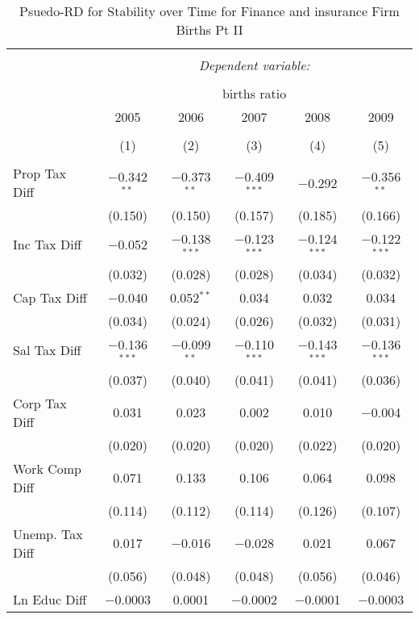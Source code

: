 
\begin{table}[!htbp] \centering 
  \caption{Psuedo-RD for Stability over Time for  Finance and insurance Firm Births Pt II} 
  \label{52year} 
\small 
\begin{tabular}{@{\extracolsep{5pt}}lccccc} 
\\[-1.8ex]\hline 
\hline \\[-1.8ex] 
 & \multicolumn{5}{c}{\textit{Dependent variable:}} \\ 
\cline{2-6} 
\\[-1.8ex] & \multicolumn{5}{c}{births ratio} \\ 
 & 2005 & 2006 & 2007 & 2008 & 2009 \\ 
\\[-1.8ex] & (1) & (2) & (3) & (4) & (5)\\ 
\hline \\[-1.8ex] 
 Prop Tax Diff & $-$0.342$^{**}$ & $-$0.373$^{**}$ & $-$0.409$^{***}$ & $-$0.292 & $-$0.356$^{**}$ \\ 
  & (0.150) & (0.150) & (0.157) & (0.185) & (0.166) \\ 
  Inc Tax Diff & $-$0.052 & $-$0.138$^{***}$ & $-$0.123$^{***}$ & $-$0.124$^{***}$ & $-$0.122$^{***}$ \\ 
  & (0.032) & (0.028) & (0.028) & (0.034) & (0.032) \\ 
  Cap Tax Diff & $-$0.040 & 0.052$^{**}$ & 0.034 & 0.032 & 0.034 \\ 
  & (0.034) & (0.024) & (0.026) & (0.032) & (0.031) \\ 
  Sal Tax Diff & $-$0.136$^{***}$ & $-$0.099$^{**}$ & $-$0.110$^{***}$ & $-$0.143$^{***}$ & $-$0.136$^{***}$ \\ 
  & (0.037) & (0.040) & (0.041) & (0.041) & (0.036) \\ 
  Corp Tax Diff & 0.031 & 0.023 & 0.002 & 0.010 & $-$0.004 \\ 
  & (0.020) & (0.020) & (0.020) & (0.022) & (0.020) \\ 
  Work Comp Diff & 0.071 & 0.133 & 0.106 & 0.064 & 0.098 \\ 
  & (0.114) & (0.112) & (0.114) & (0.126) & (0.107) \\ 
  Unemp. Tax Diff & 0.017 & $-$0.016 & $-$0.028 & 0.021 & 0.067 \\ 
  & (0.056) & (0.048) & (0.048) & (0.056) & (0.046) \\ 
  Ln Educ Diff & $-$0.0003 & 0.0001 & $-$0.0002 & $-$0.0001 & $-$0.0003 \\ 

\end{tabular}
\end{table}
